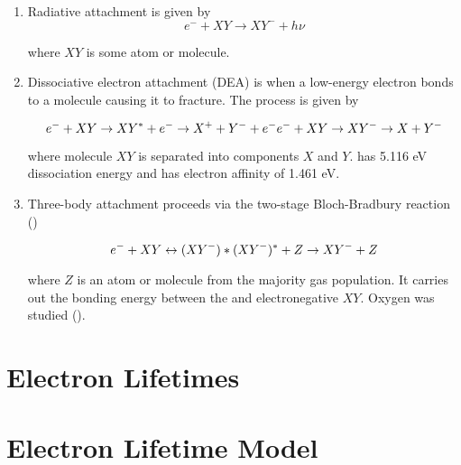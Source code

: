 \begin{enumerate}
\item Radiative attachment is given by
\begin{equation}
e^- + XY \rightarrow XY^- + h \nu
\end{equation}

\noindent where $XY$ is some atom or molecule.

\item Dissociative electron attachment (DEA) is when a low-energy electron bonds to a molecule causing it to fracture.  The process
is given by

\begin{equation}
e^- + XY \rightarrow XY^* + e^- \rightarrow X^+ + Y^- + e^- \\
e^- + XY \rightarrow XY^- \rightarrow X + Y^-
\end{equation}

\noindent where molecule $XY$ is separated into components $X$ and $Y$.   has 5.116 eV dissociation energy and  has
electron affinity of 1.461 eV.

\item Three-body attachment proceeds via the two-stage Bloch-Bradbury reaction ()

\begin{equation}
e^- + XY \leftrightarrow (XY^-)* \\
(XY^-)^* + Z \rightarrow XY^- + Z
\end{equation}

\noindent where $Z$ is an atom or molecule from the majority gas population.  It carries out the bonding energy between the
\electron and electronegative $XY$.  Oxygen was studied ().
\end{enumerate}



\section{Electron Lifetimes}
\label{sec:electron_lifetimes}



\section{Electron Lifetime Model}
\label{sec:electron_lifetime_model}



